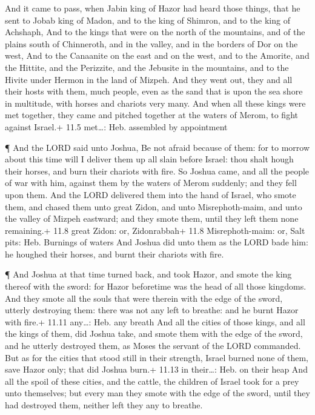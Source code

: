  And it came to pass, when Jabin king of Hazor had heard
those things, that he sent to Jobab king of Madon, and to the king of
Shimron, and to the king of Achshaph,  And to the kings that
were on the north of the mountains, and of the plains south of
Chinneroth, and in the valley, and in the borders of Dor on the west,
 And to the Canaanite on the east and on the west, and to
the Amorite, and the Hittite, and the Perizzite, and the Jebusite in the
mountains, and to the Hivite under Hermon in the land of Mizpeh.
 And they went out, they and all their hosts with them, much
people, even as the sand that is upon the sea shore in multitude, with
horses and chariots very many.  And when all these kings
were met together, they came and pitched together at the waters of
Merom, to fight against Israel.+ 11.5 met\ldots: Heb. assembled by
appointment

 ¶ And the LORD said unto Joshua, Be not afraid because of
them: for to morrow about this time will I deliver them up all slain
before Israel: thou shalt hough their horses, and burn their chariots
with fire.  So Joshua came, and all the people of war with
him, against them by the waters of Merom suddenly; and they fell upon
them.  And the LORD delivered them into the hand of Israel,
who smote them, and chased them unto great Zidon, and unto
Misrephoth-maim, and unto the valley of Mizpeh eastward; and they smote
them, until they left them none remaining.+ 11.8 great Zidon: or,
Zidonrabbah+ 11.8 Misrephoth-maim: or, Salt pits: Heb. Burnings of
waters  And Joshua did unto them as the LORD bade him: he
houghed their horses, and burnt their chariots with fire.

 ¶ And Joshua at that time turned back, and took Hazor, and
smote the king thereof with the sword: for Hazor beforetime was the head
of all those kingdoms.  And they smote all the souls that
were therein with the edge of the sword, utterly destroying them: there
was not any left to breathe: and he burnt Hazor with fire.+ 11.11
any\ldots: Heb. any breath  And all the cities of those
kings, and all the kings of them, did Joshua take, and smote them with
the edge of the sword, and he utterly destroyed them, as Moses the
servant of the LORD commanded.  But as for the cities that
stood still in their strength, Israel burned none of them, save Hazor
only; that did Joshua burn.+ 11.13 in their\ldots: Heb. on their heap
 And all the spoil of these cities, and the cattle, the
children of Israel took for a prey unto themselves; but every man they
smote with the edge of the sword, until they had destroyed them, neither
left they any to breathe.

